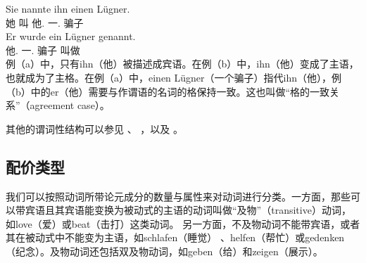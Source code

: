 \eal
\ex 
\gll Sie nannte ihn einen Lügner.\\
	 她 叫 他.\acc{} 一.\acc{} 骗子\\
\ex 
\gll Er wurde ein Lügner genannt.\\
	 他.\nom{} \passivepst{} 一.\nom{} 骗子 叫做\\
\zl
例（a）中，只有ihn（他）被描述成宾语。在例（b）中，ihn（他）变成了主语，也就成为了主格。在例（a）中，einen Lügner（一个骗子）指代ihn（他），例（b）中的er（他）需要与作谓语的名词的格保持一致。这也叫做“格的一致关系”（agreement case）。

其他的谓词性结构可以参见 、 ，以及 。

\subsection{配价类型}

我们可以按照动词所带论元成分的数量与属性来对动词进行分类。一方面，那些可以带宾语且其宾语能变换为被动式的主语的动词叫做“及物”（transitive）动词，如love（爱）或beat（击打）这类动词。
另一方面，不及物动词不能带宾语，或者其在被动式中不能变为主语，如schlafen（睡觉） 、helfen（帮忙）或gedenken（纪念）。及物动词还包括双及物动词，如geben（给）和zeigen（展示）。

